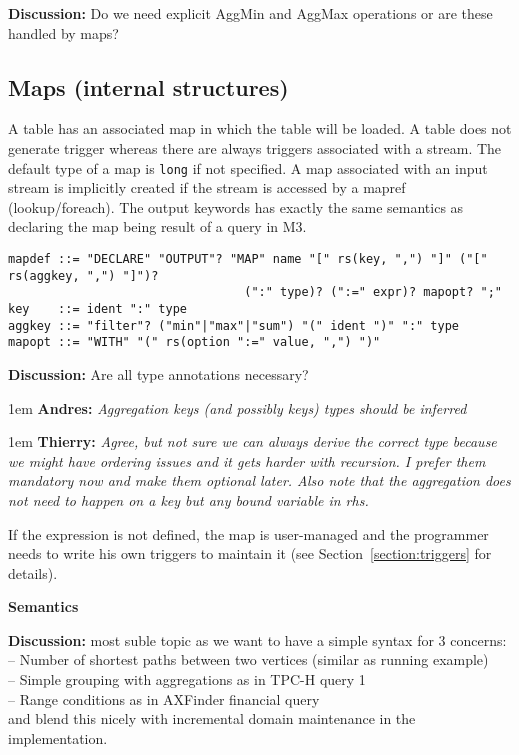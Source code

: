 \documentclass[11pt]{article}
\newlength{\dlen}
\def\discuss#1{\par\hspace{2em}
\setlength{\dlen}{\textwidth}
\addtolength{\dlen}{-2em}
\begin{minipage}{\dlen}\footnotesize {\bf\color{red} Discussion:} #1\end{minipage}\par}
\def\say#1#2{\begingroup\par\leftskip1em {\bf #1:} \it #2\par\endgroup}
\begin{document}
\discuss{Do we need explicit AggMin and AggMax operations or are these handled by maps?}

\subsection{Maps (internal structures)}
A table has an associated map in which the table will be loaded. A table does not generate trigger whereas there are always triggers associated with a stream. The default type of a map is {\tt long} if not specified. A map associated with an input stream is implicitly created if the stream is accessed by a mapref (lookup/foreach). The output keywords has exactly the same semantics as declaring the map being result of a query in M3.

\begin{verbatim}
mapdef ::= "DECLARE" "OUTPUT"? "MAP" name "[" rs(key, ",") "]" ("[" rs(aggkey, ",") "]")? 
                                 (":" type)? (":=" expr)? mapopt? ";" 
key    ::= ident ":" type
aggkey ::= "filter"? ("min"|"max"|"sum") "(" ident ")" ":" type
mapopt ::= "WITH" "(" rs(option ":=" value, ",") ")"
\end{verbatim}
\discuss{Are all type annotations necessary?
	\say{Andres}{Aggregation keys (and possibly keys) types should be inferred}
	\say{Thierry}{Agree, but not sure we can always derive the correct type because we might have ordering issues and it gets harder with recursion. I prefer them mandatory now and make them optional later. Also note that the aggregation does not need to happen on a key but any bound variable in rhs.}}

If the expression is not defined, the map is user-managed and the programmer needs to write his own triggers to maintain it (see Section~\ref{section:triggers} for details).

{\bf Semantics}
\discuss{most suble topic as we want to have a simple syntax for 3 concerns:\\
-- Number of shortest paths between two vertices (similar as \cite{socialite} running example)\\
-- Simple grouping with aggregations as in TPC-H query 1\\
-- Range conditions as in AXFinder financial query\\
and blend this nicely with incremental domain maintenance in the implementation.}
\end{document}
